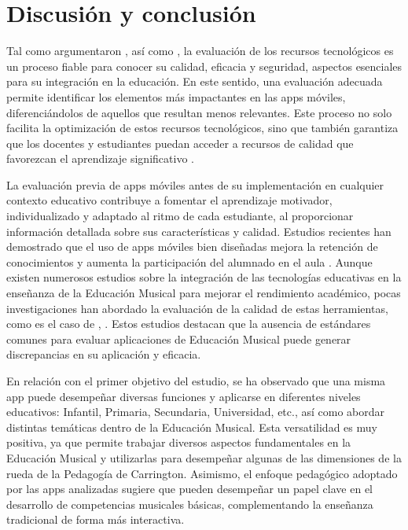 \documentclass[spanish]{textolivre}
\begin{document}
\section{Discusión y conclusión}\label{conclusao}
Tal como argumentaron \textcite{quezada-bolanos2023}, así como \textcite{delgado-morales2023}, la evaluación de los recursos tecnológicos es un proceso fiable para conocer su calidad, eficacia y seguridad, aspectos esenciales para su integración en la educación. En este sentido, una evaluación adecuada permite identificar los elementos más impactantes en las apps móviles, diferenciándolos de aquellos que resultan menos relevantes. Este proceso no solo facilita la optimización de estos recursos tecnológicos, sino que también garantiza que los docentes y estudiantes puedan acceder a recursos de calidad que favorezcan el aprendizaje significativo \cite{cheng2023}.

La evaluación previa de apps móviles antes de su implementación en cualquier contexto educativo contribuye a fomentar el aprendizaje motivador, individualizado y adaptado al ritmo de cada estudiante, al proporcionar información detallada sobre sus características y calidad. Estudios recientes han demostrado que el uso de apps móviles bien diseñadas mejora la retención de conocimientos y aumenta la participación del alumnado en el aula \cite{martinez2023}. Aunque existen numerosos estudios sobre la integración de las tecnologías educativas en la enseñanza de la Educación Musical para mejorar el rendimiento académico, pocas investigaciones han abordado la evaluación de la calidad de estas herramientas, como es el caso de \textcite{eusterbrock2023}, \textcite{dominguez-lloria2023}. Estos estudios destacan que la ausencia de estándares comunes para evaluar aplicaciones de Educación Musical puede generar discrepancias en su aplicación y eficacia.

En relación con el primer objetivo del estudio, se ha observado que una misma app puede desempeñar diversas funciones y aplicarse en diferentes niveles educativos: Infantil, Primaria, Secundaria, Universidad, etc., así como abordar distintas temáticas dentro de la Educación Musical. Esta versatilidad es muy positiva, ya que permite trabajar diversos aspectos fundamentales en la Educación Musical y utilizarlas para desempeñar algunas de las dimensiones de la rueda de la Pedagogía de Carrington. Asimismo, el enfoque pedagógico adoptado por las apps analizadas sugiere que pueden desempeñar un papel clave en el desarrollo de competencias musicales básicas, complementando la enseñanza tradicional de forma más interactiva.
\end{document}
